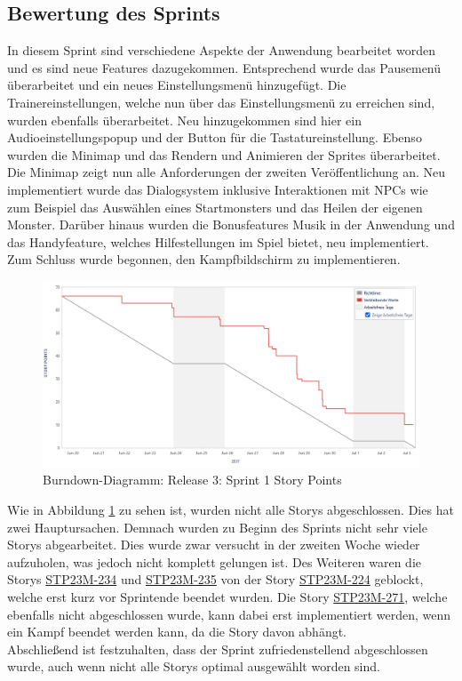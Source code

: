 \subsection{Bewertung des Sprints}
In diesem Sprint sind verschiedene Aspekte der Anwendung bearbeitet worden und es sind neue Features dazugekommen. Entsprechend wurde das Pausemenü überarbeitet und ein neues Einstellungsmenü hinzugefügt. Die Trainereinstellungen, welche nun über das Einstellungsmenü zu erreichen sind, wurden ebenfalls überarbeitet. Neu hinzugekommen sind hier ein Audioeinstellungspopup und der Button für die Tastatureinstellung. Ebenso wurden die Minimap und das Rendern und Animieren der Sprites überarbeitet. Die Minimap zeigt nun alle Anforderungen der zweiten Veröffentlichung an. Neu implementiert wurde das Dialogsystem inklusive Interaktionen mit NPCs wie zum Beispiel das Auswählen eines Startmonsters und das Heilen der eigenen Monster. Darüber hinaus wurden die Bonusfeatures Musik in der Anwendung und das Handyfeature, welches Hilfestellungen im Spiel bietet, neu implementiert. Zum Schluss wurde begonnen, den Kampfbildschirm zu implementieren.\\
\begin{figure}[H]
    \center
    \includegraphics[height=0.5\textwidth]{images/burndown/sprint1Story.png}
    \caption{Burndown-Diagramm: Release 3: Sprint 1 Story Points}
    \label{fig: sprint1Story}
\end{figure}

Wie in Abbildung \ref{fig: sprint1Story} zu sehen ist, wurden nicht alle Storys abgeschlossen. Dies hat zwei Hauptursachen. Demnach wurden zu Beginn des Sprints nicht sehr viele Storys abgearbeitet. Dies wurde zwar versucht in der zweiten Woche wieder aufzuholen, was jedoch nicht komplett gelungen ist. Des Weiteren waren die Storys \hyperlink{S234}{STP23M-234} und \hyperlink{S235}{STP23M-235} von der Story \hyperlink{S224}{STP23M-224} geblockt, welche erst kurz vor Sprintende beendet wurden. Die Story \hyperlink{S271}{STP23M-271}, welche ebenfalls nicht abgeschlossen wurde, kann dabei erst implementiert werden, wenn ein Kampf beendet werden kann, da die Story davon abhängt. \\ Abschließend ist festzuhalten, dass der Sprint zufriedenstellend abgeschlossen wurde, auch wenn nicht alle Storys optimal ausgewählt worden sind.

